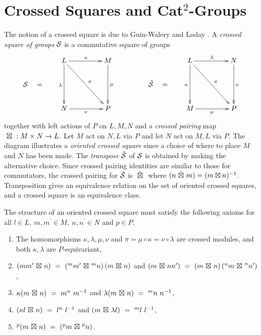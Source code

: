 \documentclass[a4paper,11pt]{article}
\theoremstyle{plain}
\theoremstyle{definition}
\begin{document}
\section{Crossed Squares and Cat$^{2}$-Groups}

The notion of a crossed square is due to Guin-Walery and Loday \cite{walery-loday}. 
A \emph{crossed square of groups} $\mathcal{S}$ is a commutative square of groups 
\begin{equation} \label{xsq-diag}
\xymatrix@R=20pt@C=20pt
{     &  L \ar[dd]_{\lambda} \ar[rr]^{\kappa} \ar[ddrr]^{\pi} 
         &  & M \ar[dd]^{\mu} 
               &  &  &  L \ar[dd]_{\kappa} \ar[rr]^{\lambda} \ar[ddrr]^{\pi} 
                        &  &  N \ar[dd]^{\nu} \\
\calS \quad = 
      &  &  &  &  &  \tilde{\calS} \quad =  \\  
      &  N \ar[rr]_{\nu} 
         &  & P & &  &  M \ar[rr]_{\mu} 
                        &  &  P } 
\end{equation}
\noindent together with left actions of $P$ on $L,M,N$ 
and a \emph{crossed pairing} map ${\ \boxtimes\ } : M \times N \rightarrow L$. 
Let $M$ act on $N,L$ via $P$ and let $N$ act on $M,L$ via $P$. 
The diagram illustrates a \emph{oriented crossed square} since a choice 
of where to place $M$ and $N$ has been made. 
The \emph{transpose} $\tilde{\mathcal{S}}$ of $\mathcal{S}$ is obtained by making the alternative choice. 
Since crossed pairing identities are similar to those for commutators, 
the crossed pairing for $\tilde{\mathcal{S}}$ is $\ \tilde{\boxtimes}\ $ 
where $(n \ \tilde{\boxtimes}\  m) = (m \boxtimes n)^{-1}$. 
Transposition gives an equivalence relation on the set of 
oriented crossed squares, and a crossed square is an equivalence class. 

The structure of an oriented crossed square must satisfy the following axioms 
for all $l \in L,~ m,m^{\prime} \in M,~ n,n^{\prime} \in N$ and $p \in P$. 
\begin{enumerate}
\item 
The homomorphisms $\kappa, \lambda, \mu, \nu$ 
and $\pi = \mu\circ\kappa = \nu\circ\lambda$ are crossed modules, 
and both $\kappa, \lambda$ are $P$-equivariant, 
\item
$(mm^{\prime} {\ \boxtimes\ } n) ~=~ (^{m}m^{\prime} {\ \boxtimes\ } {^{m}n})\,(m {\ \boxtimes\ } n)$  
\quad and \quad 
$(m {\ \boxtimes\ } {nn^{\prime}}) ~=~ (m {\ \boxtimes\ } n)\,(^{n}m {\ \boxtimes\ } ^{n}n^{\prime})$, 
\item 
$\kappa(m {\ \bt\ } n) ~=~ m^{n}\ m^{-1}$ 
\quad and \quad 
$\lambda(m {\ \boxtimes\ } n) ~=~ ^{m}n\ n^{-1}$, 
\item 
$(\kappa l {\ \bt\ } n) ~=~ l^{n}\ l^{-1}$  
\quad and \quad 
$(m {\ \boxtimes\ } \lambda l) ~=~ ^{m}l\ l^{-1}$, 
\item 
$^{p}(m {\ \bt\ } n) ~=~ (^{p}m {\ \bt\ } ^{p}n)$. 
\end{enumerate} 
\end{document}
